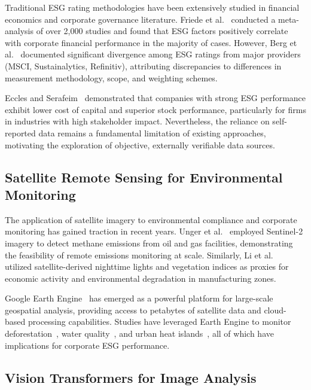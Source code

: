 Traditional ESG rating methodologies have been extensively studied in financial economics and corporate governance literature. Friede et al.~\cite{friede2015esg} conducted a meta-analysis of over 2,000 studies and found that ESG factors positively correlate with corporate financial performance in the majority of cases. However, Berg et al.~\cite{berg2019aggregate} documented significant divergence among ESG ratings from major providers (MSCI, Sustainalytics, Refinitiv), attributing discrepancies to differences in measurement methodology, scope, and weighting schemes.

Eccles and Serafeim~\cite{eccles2014financial} demonstrated that companies with strong ESG performance exhibit lower cost of capital and superior stock performance, particularly for firms in industries with high stakeholder impact. Nevertheless, the reliance on self-reported data remains a fundamental limitation of existing approaches, motivating the exploration of objective, externally verifiable data sources.

\subsection{Satellite Remote Sensing for Environmental Monitoring}

The application of satellite imagery to environmental compliance and corporate monitoring has gained traction in recent years. Unger et al.~\cite{unger2020satellite} employed Sentinel-2 imagery to detect methane emissions from oil and gas facilities, demonstrating the feasibility of remote emissions monitoring at scale. Similarly, Li et al.~\cite{li2020alternative} utilized satellite-derived nighttime lights and vegetation indices as proxies for economic activity and environmental degradation in manufacturing zones.

Google Earth Engine~\cite{gorelick2017google} has emerged as a powerful platform for large-scale geospatial analysis, providing access to petabytes of satellite data and cloud-based processing capabilities. Studies have leveraged Earth Engine to monitor deforestation~\cite{hansen2013forest}, water quality~\cite{doxani2018water}, and urban heat islands~\cite{venter2021urban}, all of which have implications for corporate ESG performance.

\subsection{Vision Transformers for Image Analysis}

